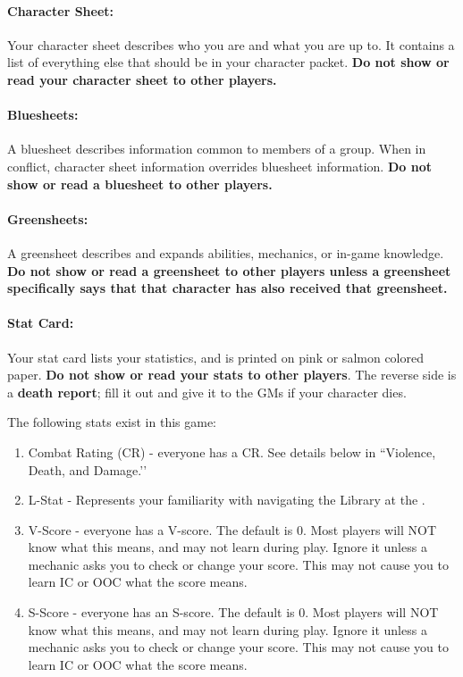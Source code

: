 \documentclass[sheet]{GL2020}
\begin{document}
\paragraph{Character Sheet:} Your character sheet describes who you are and what you are up to.  It contains a list of everything else that should be in your character packet. \textbf{Do not show or read your character sheet to other players.}

\paragraph{Bluesheets:} A bluesheet describes information common to members of a group.  When in conflict, character sheet information overrides bluesheet information. \textbf{Do not show or read a bluesheet to other players.}

\paragraph{Greensheets:} A greensheet describes and expands abilities, mechanics, or in-game knowledge.\textbf{ Do not show or read a greensheet to other players unless a greensheet specifically says that that character has also received that greensheet.}

\paragraph{Stat Card:} Your stat card lists your statistics, and is printed on pink or salmon colored paper. \textbf{Do not show or read your stats to other players}. The reverse side is a {\bf death report}; fill it out and give it to the GMs if your character dies.

The following stats exist in this game:
\begin{enumerate}
	\item Combat Rating (CR) - everyone has a CR. See details below in ``Violence, Death, and Damage.’’
	\item L-Stat - Represents your familiarity with navigating the Library at the \pSc{}.
	\item V-Score - everyone has a V-score. The default is 0. Most players will NOT know what this means, and may not learn during play. Ignore it unless a mechanic asks you to check or change your score. This may not cause you to learn IC or OOC what the score means.
	\item S-Score - everyone has an S-score. The default is 0. Most players will NOT know what this means, and may not learn during play. Ignore it unless a mechanic asks you to check or change your score. This may not cause you to learn IC or OOC what the score means.
\end{enumerate}
\end{document}
